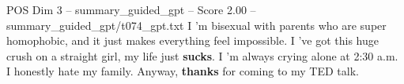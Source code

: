 \begin{textsample}{POS Dim 3 – summary\_guided\_gpt – Score 2.00 – summary\_guided\_gpt/t074\_gpt.txt}  \label{ex:f3_pos_022}
I ’m bisexual with parents who are super homophobic, and it just makes everything feel impossible.
I ’ve got this huge crush on a straight girl, my life just \textbf{sucks}.
I ’m always crying alone at 2:30 a.m.
I honestly hate my family.
Anyway, \textbf{thanks} for coming to my TED talk.

\end{textsample}
